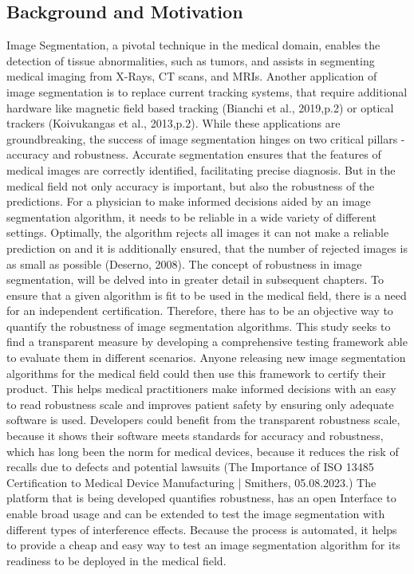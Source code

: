 \documentclass[11pt, a4paper,onecolumn ,titlepage]{article}
\begin{document}
    \subsection{Background and Motivation}
    \label{subsec:background}
    Image Segmentation, a pivotal technique in the medical domain, enables the detection of tissue abnormalities, such
    as tumors, and assists in segmenting medical imaging from X-Rays, CT scans, and MRIs\parencite{kurbig-2005}.
    Another application of image segmentation is to replace current tracking systems, that require additional hardware
    like magnetic field based tracking (Bianchi et al., 2019,p.2) or optical trackers (Koivukangas et al., 2013,p.2).
    While these applications are groundbreaking, the success of image segmentation hinges on two critical pillars -
    accuracy and robustness. Accurate segmentation ensures that the features of medical images are correctly identified,
    facilitating precise diagnosis. But in the medical field not only accuracy is important, but also the robustness of
    the predictions. For a physician to make informed decisions aided by an image segmentation algorithm, it needs to
    be reliable in a wide variety of different settings. Optimally, the algorithm rejects all images it can not make a
    reliable prediction on and it is additionally ensured, that the number of rejected images is as small as possible
    (Deserno, 2008). The concept of robustness in image segmentation, will be delved into in greater detail in
    subsequent chapters. To ensure that a given algorithm is fit to be used in the medical field, there is a need for
    an independent certification. Therefore, there has to be an objective way to quantify the robustness of image
    segmentation algorithms. This study seeks to find a transparent measure by developing a comprehensive testing
    framework able to evaluate them in different scenarios. Anyone releasing new image segmentation algorithms for
    the medical field could then use this framework to certify their product. This helps medical practitioners make
    informed decisions with an easy to read robustness scale and improves patient safety by ensuring only adequate
    software is used. Developers could benefit from the transparent robustness scale, because it shows their software
    meets standards for accuracy and robustness, which has long been the norm for medical devices, because it reduces
    the risk of recalls due to defects and potential lawsuits (The Importance of ISO 13485 Certification to Medical
    Device Manufacturing | Smithers, 05.08.2023.) The platform that is being developed quantifies robustness, has an
    open Interface to enable broad usage and can be extended to test the image segmentation with different types of
    interference effects. Because the process is automated, it helps to provide a cheap and easy way to test an image
    segmentation algorithm for its readiness to be deployed in the medical field.
\end{document}
